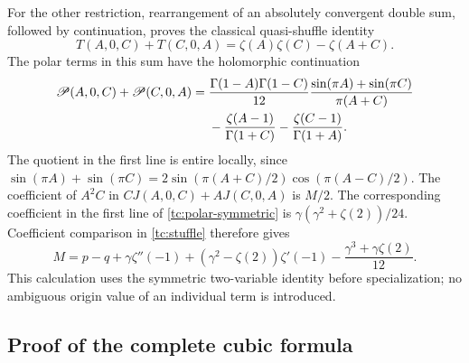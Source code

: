 For the other restriction, rearrangement of an absolutely convergent
double sum, followed by continuation, proves the classical
quasi-shuffle identity
\begin{equation}
 T(A,0,C)+T(C,0,A)=\zeta(A)\zeta(C)-\zeta(A+C).
 \label{tc:stuffle}
\end{equation}
The polar terms in this sum have the holomorphic continuation
\begin{align}
 \mathscr P(A,0,C)+\mathscr P(C,0,A)
 ={}&\frac{\Gamma(1-A)\Gamma(1-C)}{12}
       \frac{\sin(\pi A)+\sin(\pi C)}{\pi(A+C)}\notag\\
 &-\frac{\zeta(A-1)}{\Gamma(1+C)}
  -\frac{\zeta(C-1)}{\Gamma(1+A)}.
 \label{tc:polar-symmetric}
\end{align}
The quotient in the first line is entire locally, since
$\sin(\pi A)+\sin(\pi C)
=2\sin(\pi(A+C)/2)\cos(\pi(A-C)/2)$.
The coefficient of $A^2C$ in $C J(A,0,C)+A J(C,0,A)$ is $M/2$.
The corresponding coefficient in the first line of
\eqref{tc:polar-symmetric} is
$\gamma(\gamma^2+\zeta(2))/24$.  Coefficient comparison in
\eqref{tc:stuffle} therefore gives
\begin{equation}
 M=p-q+\gamma\zeta''(-1)
      +(\gamma^2-\zeta(2))\zeta'(-1)
      -\frac{\gamma^3+\gamma\zeta(2)}{12}.
 \label{tc:M}
\end{equation}
This calculation uses the symmetric two-variable identity before
specialization; no ambiguous origin value of an individual term is
introduced.

\subsection{Proof of the complete cubic formula}

